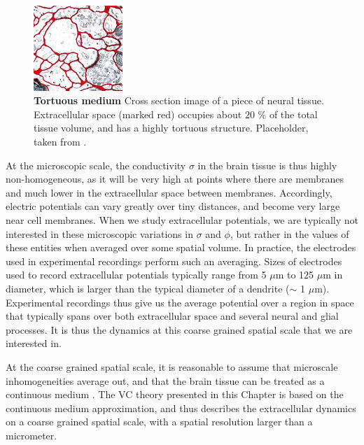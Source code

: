 \begin{figure}[!ht]
\begin{center}
\includegraphics[width=0.3\textwidth]{Figures/ECSdummy.jpeg}
\end{center}
\caption{\textbf{Tortuous medium}  Cross section image of a piece of neural tissue. Extracellular space (marked red) occupies about 20 \% of the total tissue volume, and has a highly tortuous structure. Placeholder, taken from \cite{Sykova2008}.
}
\label{fig:ECS}
\end{figure}

At the microscopic scale, the conductivity $\sigma$ in the brain tissue is thus highly non-homogeneous, as it will be very high at points where there are membranes and much lower in the extracellular space between membranes. Accordingly, electric potentials can vary greatly over tiny distances, and become very large near cell membranes. When we study extracellular potentials, we are typically not interested in these microscopic variations in $\sigma$ and $\phi$, but rather in the values of these entities when averaged over some spatial volume. In practice, the electrodes used in experimental recordings perform such an averaging. Sizes of electrodes used to record extracellular potentials typically range from 5 $\mu$m to 125 $\mu$m in diameter\cite{Viswam2019}, which is larger than the typical diameter of a dendrite ($\sim$ 1 $\mu$m). Experimental recordings thus give us the average potential over a region in space that typically spans over both extracellular space and several neural and glial processes. It is thus the dynamics at this coarse grained spatial scale that we are interested in. 

At the coarse grained spatial scale, it is reasonable to assume that microscale inhomogeneities average out, and that the brain tissue can be treated as a continuous medium \cite{Gratiy2017}. The VC theory presented in this Chapter is based on the continuous medium approximation, and thus describes the extracellular dynamics on a coarse grained spatial scale, with a spatial resolution larger than a micrometer. 

